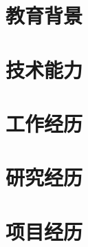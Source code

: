 \documentclass[zh]{resume}
\begin{document}

\newcommand{\equalcontrib}{$^{\dagger}$}




\section{教育背景}





\section{技术能力}




\section{工作经历}





\section{研究经历}




\section{项目经历}




\end{document}
